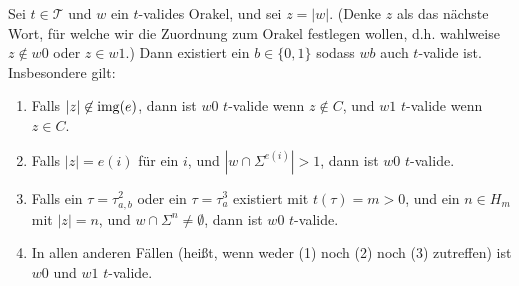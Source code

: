 \begin{lemma}\label{claim:oracle-up-extension}
    Sei $t\in\mathcal T$ und $w$ ein $t$-valides Orakel, und sei $z=|w|$. 
    (Denke $z$ als das nächste Wort, für welche wir die Zuordnung zum Orakel festlegen wollen, d.h. wahlweise $z\not\in w0$ oder $z\in w1$.)
    Dann existiert ein $b\in\{0,1\}$ sodass $wb$ auch $t$-valide ist.
    Insbesondere gilt:
    \begin{enumerate}
        \item Falls $|z|\not\in \operatorname{img}(e)$, dann ist $w0$ $t$-valide wenn $z\not\in C$, und $w1$ $t$-valide wenn $z\in C$.
        \item Falls $|z|=e(i)$ für ein $i$, und $|w\cap\Sigma^{e(i)}|> 1$, dann ist $w0$ $t$-valide.
        \item Falls ein $\tau=\tau^2_{a,b}$ oder ein $\tau=\tau^3_a$ existiert mit $t(\tau)=m>0$, und ein $n\in H_m$ mit $|z|=n$, und $w\cap\Sigma^{n}\neq\emptyset$, dann ist $w0$ $t$-valide.
        \item In allen anderen Fällen (heißt, wenn weder (1) noch (2) noch (3) zutreffen) ist $w0$ und $w1$ $t$-valide.
    \end{enumerate}
\end{lemma}
